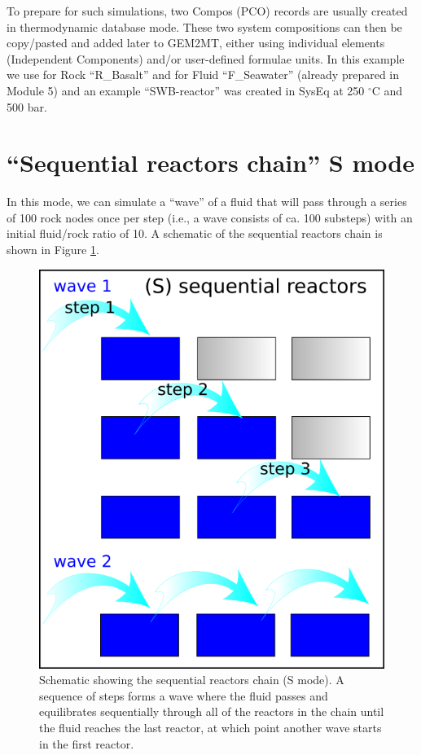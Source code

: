 \documentclass[
]{book}
\begin{document}
To prepare for such simulations, two Compos (PCO) records are usually created in thermodynamic database mode. These two system compositions can then be copy/pasted and added later to GEM2MT, either using individual elements (Independent Components) and/or user-defined formulae units. In this example we use for Rock ``R\_Basalt'' and for Fluid ``F\_Seawater'' (already prepared in Module 5) and an example ``SWB-reactor'' was created in SysEq at 250 \(^{\circ}\)C and 500 bar.

\hypertarget{sequential-reactors-chain-s-mode}{%
\section{``Sequential reactors chain'' S mode}\label{sequential-reactors-chain-s-mode}}

In this mode, we can simulate a ``wave'' of a fluid that will pass through a series of 100 rock nodes once per step (i.e., a wave consists of ca. 100 substeps) with an initial fluid/rock ratio of 10. A schematic of the sequential reactors chain is shown in Figure \ref{fig:fig-1e}.

\begin{figure}
\includegraphics[width=0.7\linewidth]{figures/module5/fig-1} \caption{Schematic showing the sequential reactors chain (S mode). A sequence of steps forms a wave where the fluid passes and equilibrates sequentially through all of the reactors in the chain until the fluid reaches the last reactor, at which point another wave starts in the first reactor.}\label{fig:fig-1e}
\end{figure}
\end{document}
